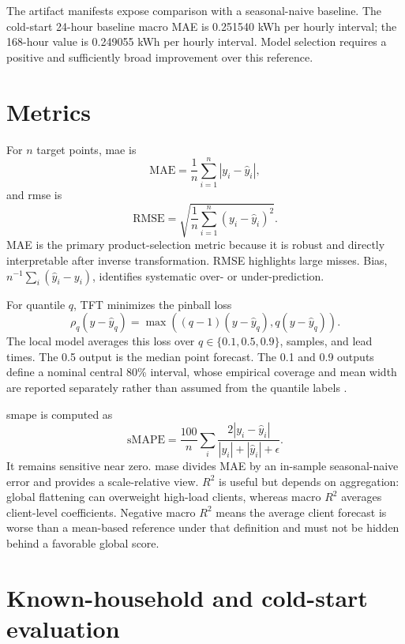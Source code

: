 The artifact manifests expose comparison with a seasonal-naive baseline. The cold-start 24-hour baseline macro MAE is 0.251540 kWh per hourly interval; the 168-hour value is 0.249055 kWh per hourly interval. Model selection requires a positive and sufficiently broad improvement over this reference.

\section{Metrics}

For $n$ target points, \ac{mae} is
\begin{equation}
 \mathrm{MAE}=\frac{1}{n}\sum_{i=1}^{n}|y_i-\hat y_i|,
\end{equation}
and \ac{rmse} is
\begin{equation}
 \mathrm{RMSE}=\sqrt{\frac{1}{n}\sum_{i=1}^{n}(y_i-\hat y_i)^2}.
\end{equation}
MAE is the primary product-selection metric because it is robust and directly interpretable after inverse transformation. RMSE highlights large misses. Bias, $n^{-1}\sum_i(\hat y_i-y_i)$, identifies systematic over- or under-prediction.

For quantile $q$, TFT minimizes the pinball loss
\begin{equation}
 \rho_q(y-\hat y_q)=\max\left((q-1)(y-\hat y_q),q(y-\hat y_q)\right).
\end{equation}
The local model averages this loss over $q\in\{0.1,0.5,0.9\}$, samples, and lead times. The 0.5 output is the median point forecast. The 0.1 and 0.9 outputs define a nominal central 80\% interval, whose empirical coverage and mean width are reported separately rather than assumed from the quantile labels \cite{koenker1978quantile,gneiting2014probabilistic}.

\ac{smape} is computed as
\begin{equation}
 \mathrm{sMAPE}=\frac{100}{n}\sum_i\frac{2|y_i-\hat y_i|}{|y_i|+|\hat y_i|+\epsilon}.
\end{equation}
It remains sensitive near zero. \ac{mase} divides MAE by an in-sample seasonal-naive error and provides a scale-relative view. $R^2$ is useful but depends on aggregation: global flattening can overweight high-load clients, whereas macro $R^2$ averages client-level coefficients. Negative macro $R^2$ means the average client forecast is worse than a mean-based reference under that definition and must not be hidden behind a favorable global score.

\section{Known-household and cold-start evaluation}

